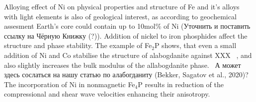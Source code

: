 \documentclass[twoside,twocolumn,9pt]{article}
\begin{document}
Alloying effect of Ni on physical properties and structure of Fe and it's alloys with light elements is also of geological interest, as according to geochemical assesment Earth's core could contain up to 10mol\% of Ni \cite{} {\color{red}(Уточнить и поставить ссылку на Чёрную Книжку (?))}.
Addition of nickel to iron phosphides affect the structure and phase stability. 
The example of Fe$_2$P shows, that even a small addition of Ni and Co stabilise the structure of alabogdanite against XXX ~\cite{Britvin-2002, Buseck1969, Nisar-2010-EPSL}, and also slightly increases the  bulk modulus of the allabogdanite phase.~\cite{Nisar-2010-EPSL} 
А может здесь сослаться на нашу статью по алабогданиту (Bekker, Sagatov et al., 2020)?
The incorporation of Ni in nonmagnetic Fe$_4$P results in reduction of the compressional and shear wave velocities enhancing their anisotropy.\cite{Wu-2011-GRL}
\end{document}
